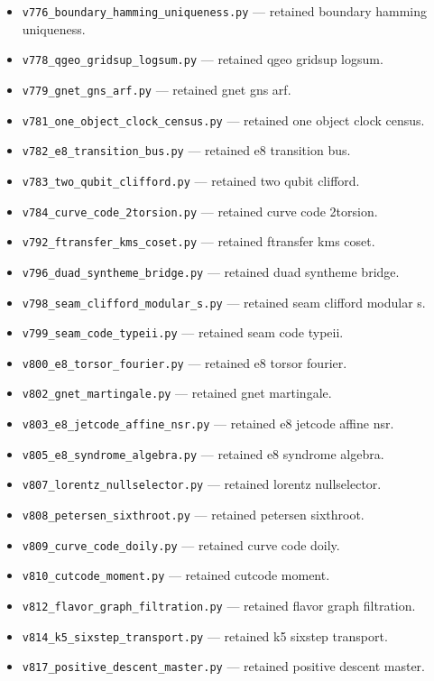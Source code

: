 \begin{itemize}[leftmargin=2em,itemsep=1pt]
\item \texttt{v776\_boundary\_hamming\_uniqueness.py} --- retained boundary hamming uniqueness.
\item \texttt{v778\_qgeo\_gridsup\_logsum.py} --- retained qgeo gridsup logsum.
\item \texttt{v779\_gnet\_gns\_arf.py} --- retained gnet gns arf.
\item \texttt{v781\_one\_object\_clock\_census.py} --- retained one object clock census.
\item \texttt{v782\_e8\_transition\_bus.py} --- retained e8 transition bus.
\item \texttt{v783\_two\_qubit\_clifford.py} --- retained two qubit clifford.
\item \texttt{v784\_curve\_code\_2torsion.py} --- retained curve code 2torsion.
\item \texttt{v792\_ftransfer\_kms\_coset.py} --- retained ftransfer kms coset.
\item \texttt{v796\_duad\_syntheme\_bridge.py} --- retained duad syntheme bridge.
\item \texttt{v798\_seam\_clifford\_modular\_s.py} --- retained seam clifford modular s.
\item \texttt{v799\_seam\_code\_typeii.py} --- retained seam code typeii.
\item \texttt{v800\_e8\_torsor\_fourier.py} --- retained e8 torsor fourier.
\item \texttt{v802\_gnet\_martingale.py} --- retained gnet martingale.
\item \texttt{v803\_e8\_jetcode\_affine\_nsr.py} --- retained e8 jetcode affine nsr.
\item \texttt{v805\_e8\_syndrome\_algebra.py} --- retained e8 syndrome algebra.
\item \texttt{v807\_lorentz\_nullselector.py} --- retained lorentz nullselector.
\item \texttt{v808\_petersen\_sixthroot.py} --- retained petersen sixthroot.
\item \texttt{v809\_curve\_code\_doily.py} --- retained curve code doily.
\item \texttt{v810\_cutcode\_moment.py} --- retained cutcode moment.
\item \texttt{v812\_flavor\_graph\_filtration.py} --- retained flavor graph filtration.
\item \texttt{v814\_k5\_sixstep\_transport.py} --- retained k5 sixstep transport.
\item \texttt{v817\_positive\_descent\_master.py} --- retained positive descent master.

\end{itemize}
